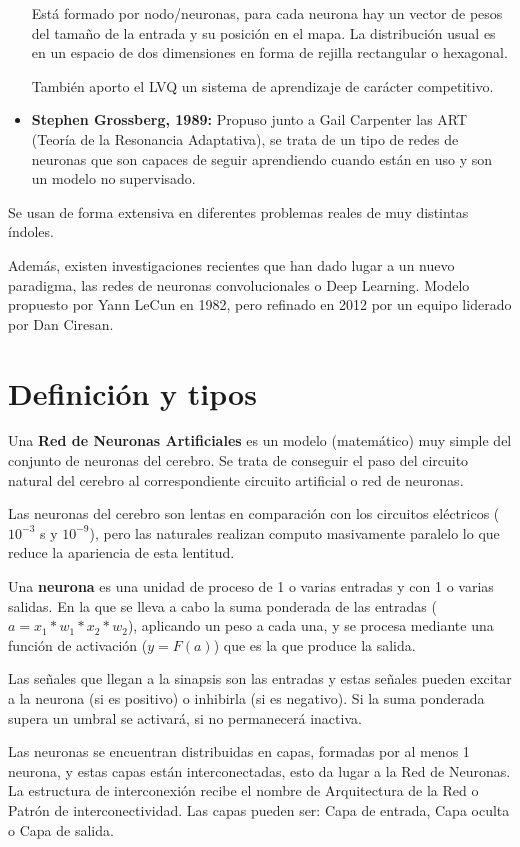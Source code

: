 \documentclass[12pt, twoside, openright]{report} %
\begin{document}
\begin{itemize}
	      Está formado por nodo/neuronas, para cada neurona hay un vector de pesos del tamaño de la entrada y su posición en el mapa. La distribución usual es en un espacio de dos dimensiones en forma de rejilla rectangular o hexagonal.
	      
	      También aporto el LVQ un sistema de aprendizaje de carácter competitivo.
	\item \textbf{Stephen Grossberg, 1989:} Propuso junto a Gail Carpenter las ART (Teoría de la Resonancia Adaptativa), se trata de un tipo de redes de neuronas que son capaces de seguir aprendiendo cuando están en uso y son un modelo no supervisado.
\end{itemize}

Se usan de forma extensiva en diferentes problemas reales de muy distintas índoles.

Además, existen investigaciones recientes que han dado lugar a un nuevo paradigma, las redes de neuronas convolucionales o Deep Learning. Modelo propuesto por Yann LeCun en 1982, pero refinado en 2012 por un equipo liderado por Dan Ciresan.

\section{Definición y tipos}
Una \textbf{Red de Neuronas Artificiales} es un modelo (matemático) muy simple del conjunto de neuronas del cerebro. Se trata de conseguir el paso del circuito natural del cerebro al correspondiente circuito artificial o red de neuronas.

Las neuronas del cerebro son lentas en comparación con los circuitos eléctricos ($10^{-3}$ s y $10^{-9}$), pero las naturales realizan computo masivamente paralelo lo que reduce la apariencia de esta lentitud.

Una \textbf{neurona} es una unidad de proceso de 1 o varias entradas y con 1 o varias salidas. En la que se lleva a cabo la suma ponderada de las entradas ($a=x_1*w_1*x_2*w_2$), aplicando un peso a cada una, y se procesa mediante una función de activación ($y=F(a)$) que es la que produce la salida. 

Las señales que llegan a la sinapsis son las entradas y estas señales pueden excitar a la neurona (si es positivo) o inhibirla (si es negativo). Si la suma ponderada supera un umbral se activará, si no permanecerá inactiva. 

Las neuronas se encuentran distribuidas en capas, formadas por al menos 1 neurona, y estas capas están interconectadas, esto da lugar a la Red de Neuronas. La estructura de interconexión recibe el nombre de Arquitectura de la Red o Patrón de interconectividad. Las capas pueden ser: Capa de entrada, Capa oculta o Capa de salida.
\end{document}
